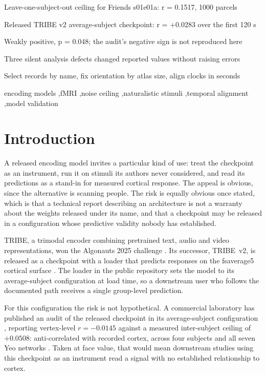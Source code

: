 \documentclass[preprint,12pt]{elsarticle}
\begin{document}
\begin{frontmatter}
\begin{highlights}
\item Leave-one-subject-out ceiling for Friends s01e01a: r = 0.1517, 1000 parcels
\item Released TRIBE v2 average-subject checkpoint: r = +0.0283 over the first 120 s
\item Weakly positive, p = 0.048; the audit's negative sign is not reproduced here
\item Three silent analysis defects changed reported values without raising errors
\item Select records by name, fix orientation by atlas size, align clocks in seconds
\end{highlights}

\begin{keyword}
encoding models \sep fMRI \sep noise ceiling \sep naturalistic stimuli \sep temporal
alignment \sep model validation
\end{keyword}

\end{frontmatter}

\section{Introduction}
\label{sec:intro}

A released encoding model invites a particular kind of use: treat the checkpoint as an
instrument, run it on stimuli its authors never considered, and read its predictions as a
stand-in for measured cortical response. The appeal is obvious, since the alternative is
scanning people. The risk is equally obvious once stated, which is that a technical report
describing an architecture is not a warranty about the weights released under its name, and
that a checkpoint may be released in a configuration whose predictive validity nobody has
established.

TRIBE, a trimodal encoder combining pretrained text, audio and video representations, won the
Algonauts 2025 challenge \cite{tribe2025}. Its successor, TRIBE~v2, is released as a
checkpoint with a loader that predicts responses on the fsaverage5 cortical surface
\cite{tribev2}. The loader in the public repository sets the model to its average-subject
configuration at load time, so a downstream user who follows the documented path receives a
single group-level prediction.

For this configuration the risk is not hypothetical. A commercial laboratory has published an
audit of the released checkpoint in its average-subject configuration \cite{sapient2026},
reporting vertex-level $r = -0.0145$ against a measured inter-subject ceiling of $+0.0508$:
anti-correlated with recorded cortex, across four subjects and all seven Yeo networks
\cite{yeo2011}. Taken at face value, that would mean downstream studies using this checkpoint
as an instrument read a signal with no established relationship to cortex.
\end{document}
